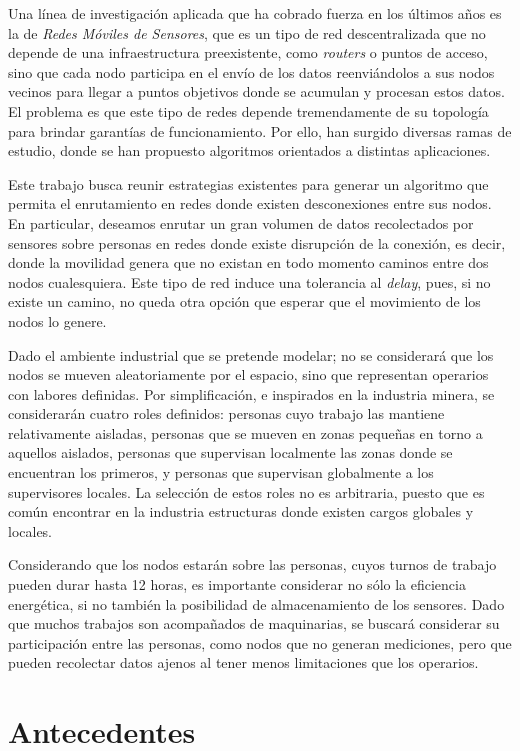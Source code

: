 \documentclass[10pt,preprint,onecolumn]{paper}
\begin{document}
Una línea de investigación aplicada que ha cobrado fuerza en los últimos años es la de \emph{Redes Móviles de Sensores}, que es un tipo de red descentralizada que no depende de una infraestructura preexistente, como \emph{routers} o puntos de acceso, sino que cada nodo participa en el envío de los datos reenviándolos a sus nodos vecinos para llegar a puntos objetivos donde se acumulan y procesan estos datos. El problema es que este tipo de redes depende tremendamente de su topología para brindar garantías de funcionamiento. Por ello, han surgido diversas ramas de estudio, donde se han propuesto algoritmos orientados a distintas aplicaciones. 

Este trabajo busca reunir estrategias existentes para generar un algoritmo que permita el enrutamiento en redes donde existen desconexiones entre sus nodos. En particular, deseamos enrutar un gran volumen de datos recolectados por sensores sobre personas en redes donde existe disrupción de la conexión, es decir, donde la movilidad genera que no existan en todo momento caminos entre dos nodos cualesquiera. Este tipo de red induce una tolerancia al \emph{delay}, pues, si no existe un camino, no queda otra opción que esperar que el movimiento de los nodos lo genere.

Dado el ambiente industrial que se pretende modelar; no se considerará que los nodos se mueven aleatoriamente por el espacio, sino que representan operarios con labores definidas. Por simplificación, e inspirados en la industria minera, se considerarán cuatro roles definidos: personas cuyo trabajo las mantiene relativamente aisladas, personas que se mueven en zonas pequeñas en torno a aquellos aislados, personas que supervisan localmente las zonas donde se encuentran los primeros, y personas que supervisan globalmente a los supervisores locales. La selección de estos roles no es arbitraria, puesto que es común encontrar en la industria estructuras donde existen cargos globales y locales. 

Considerando que los nodos estarán sobre las personas, cuyos turnos de trabajo pueden durar hasta 12 horas, es importante considerar no sólo la eficiencia energética, si no también la posibilidad de almacenamiento de los sensores. Dado que muchos trabajos son acompañados de maquinarias, se buscará considerar su participación entre las personas, como nodos que no generan mediciones, pero que pueden recolectar datos ajenos al tener menos limitaciones que los operarios.

\section{Antecedentes}
\end{document}

